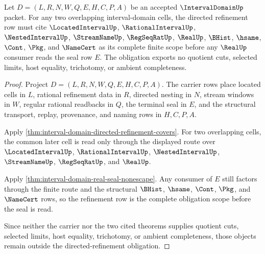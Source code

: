 \begin{theorem}
\label{thm:intervaldomain-directed-refinement-obligation-scope}
Let $D=(L,R,N,W,Q,E,H,C,P,A)$ be an accepted $\IntervalDomainUp$ packet. For any two overlapping interval-domain cells, the directed refinement row must cite $\LocatedIntervalUp$, $\RationalIntervalUp$, $\NestedIntervalUp$, $\StreamNameUp$, $\RegSeqRatUp$, $\RealUp$, $\BHist$, $\hsame$, $\Cont$, $\Pkg$, and $\NameCert$ as its complete finite scope before any $\RealUp$ consumer reads the seal row $E$. The obligation exports no quotient cuts, selected limits, host equality, trichotomy, or ambient completeness.
\end{theorem}
\begin{proof}
Project $D=(L,R,N,W,Q,E,H,C,P,A)$. The carrier rows place located cells in $L$, rational refinement data in $R$, directed nesting in $N$, stream windows in $W$, regular rational readbacks in $Q$, the terminal seal in $E$, and the structural transport, replay, provenance, and naming rows in $H,C,P,A$.

Apply \autoref{thm:interval-domain-directed-refinement-covers}. For two overlapping cells, the common later cell is read only through the displayed route over $\LocatedIntervalUp$, $\RationalIntervalUp$, $\NestedIntervalUp$, $\StreamNameUp$, $\RegSeqRatUp$, and $\RealUp$.

Apply \autoref{thm:interval-domain-real-seal-nonescape}. Any consumer of $E$ still factors through the finite route and the structural $\BHist$, $\hsame$, $\Cont$, $\Pkg$, and $\NameCert$ rows, so the refinement row is the complete obligation scope before the seal is read.

Since neither the carrier nor the two cited theorems supplies quotient cuts, selected limits, host equality, trichotomy, or ambient completeness, those objects remain outside the directed-refinement obligation.
\end{proof}

